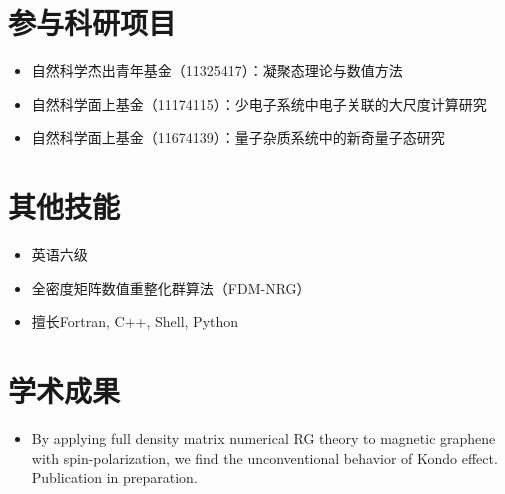 \documentclass{resume}
\begin{document}
\section{参与科研项目}
\begin{itemize}
\item 自然科学杰出青年基金（11325417）：凝聚态理论与数值方法
\item 自然科学面上基金（11174115）：少电子系统中电子关联的大尺度计算研究
\item 自然科学面上基金（11674139）：量子杂质系统中的新奇量子态研究
\end{itemize}

\section{其他技能}
\begin{itemize}[parsep=0.5ex]
\item 英语六级
\item 全密度矩阵数值重整化群算法（FDM-NRG）
\item 擅长Fortran, C++, Shell, Python
\end{itemize}

\section{学术成果}
\begin{itemize}[parsep=0.5ex]
\item By applying full density matrix numerical RG theory to magnetic graphene with
  spin-polarization, we find the unconventional behavior of Kondo
  effect. Publication in preparation.
\end{itemize}


%  
\end{document}
